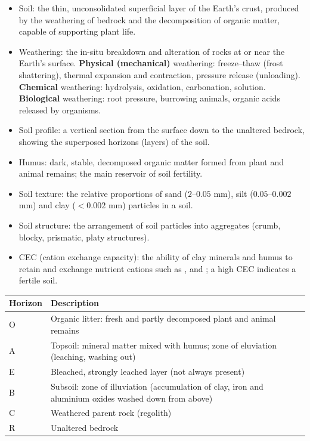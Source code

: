 \documentclass[11pt]{article}
\newcommand{\cle}[1]{{\popxbold\color{popdark}#1}}
\begin{document}
\begin{aretenir}
\begin{itemize}
\item \cle{Soil}: the thin, unconsolidated superficial layer of the Earth's crust, produced by the \cle{weathering} of bedrock and the decomposition of organic matter, capable of supporting plant life.
\item \cle{Weathering}: the in-situ breakdown and alteration of rocks at or near the Earth's surface. \textbf{Physical (mechanical)} weathering: freeze--thaw (frost shattering), thermal expansion and contraction, pressure release (unloading). \textbf{Chemical} weathering: hydrolysis, oxidation, carbonation, solution. \textbf{Biological} weathering: root pressure, burrowing animals, organic acids released by organisms.
\item \cle{Soil profile}: a vertical section from the surface down to the unaltered bedrock, showing the superposed \cle{horizons} (layers) of the soil.
\item \cle{Humus}: dark, stable, decomposed organic matter formed from plant and animal remains; the main reservoir of soil fertility.
\item \cle{Soil texture}: the relative proportions of sand ($2$--$0.05$ mm), silt ($0.05$--$0.002$ mm) and clay ($<0.002$ mm) particles in a soil.
\item \cle{Soil structure}: the arrangement of soil particles into aggregates (crumb, blocky, prismatic, platy structures).
\item \cle{CEC} (cation exchange capacity): the ability of clay minerals and humus to retain and exchange nutrient cations such as ,  and ; a high CEC indicates a fertile soil.
\end{itemize}
\end{aretenir}

\begin{aretenir}
\begin{center}
\begin{tabularx}{\linewidth}{|l|X|}
\hline
\rowcolor{popblueL} \textbf{Horizon} & \textbf{Description} \\
\hline
O & Organic litter: fresh and partly decomposed plant and animal remains \\
\hline
A & Topsoil: mineral matter mixed with humus; zone of \cle{eluviation} (leaching, washing out) \\
\hline
E & Bleached, strongly leached layer (not always present) \\
\hline
B & Subsoil: zone of \cle{illuviation} (accumulation of clay, iron and aluminium oxides washed down from above) \\
\hline
C & Weathered parent rock (regolith) \\
\hline
R & Unaltered bedrock \\
\hline
\end{tabularx}
\end{center}
\end{aretenir}
\end{document}

